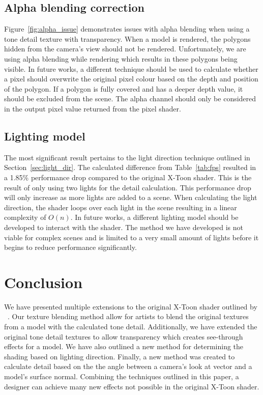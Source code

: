 \documentclass[annual]{acmsiggraph}
\begin{document}
\subsection{Alpha blending correction}
Figure~\ref{fig:alpha_issue} demonstrates issues with alpha blending when using a tone detail texture with transparency. When a model is rendered, the polygons hidden from the camera's view should not be rendered. Unfortunately, we are using alpha blending while rendering which results in these polygons being visible. In future works, a different technique should be used to calculate whether a pixel should overwrite the original pixel colour based on the depth and position of the polygon. If a polygon is fully covered and has a deeper depth value, it should be excluded from the scene. The alpha channel should only be considered in the output pixel value returned from the pixel shader.

\subsection{Lighting model}
The most significant result pertains to the light direction technique outlined in Section~\ref{sec:light_dir}. The calculated difference from Table~\ref{tab:fps} resulted in a 1.85\% performance drop compared to the original X-Toon shader. This is the result of only using two lights for the detail calculation. This performance drop will only increase as more lights are added to a scene. When calculating the light direction, the shader loops over each light in the scene resulting in a linear complexity of $O(n)$. In future works, a different lighting model should be developed to interact with the shader. The method we have developed is not viable for complex scenes and is limited to a very small amount of lights before it begins to reduce performance significantly. 

\section{Conclusion}
\label{sec:conclusion}
We have presented multiple extensions to the original X-Toon shader outlined by ~\cite{BTM06a}. Our texture blending method allow for artists to blend the original textures from a model with the calculated tone detail. Additionally, we have extended the original tone detail textures to allow transparency which creates see-through effects for a model. We have also outlined a new method for determining the shading based on lighting direction. Finally, a new method was created to calculate detail based on the the angle between a camera's look at vector and a model's surface normal. Combining the techniques outlined in this paper, a designer can achieve many new effects not possible in the original X-Toon shader.



\end{document}
